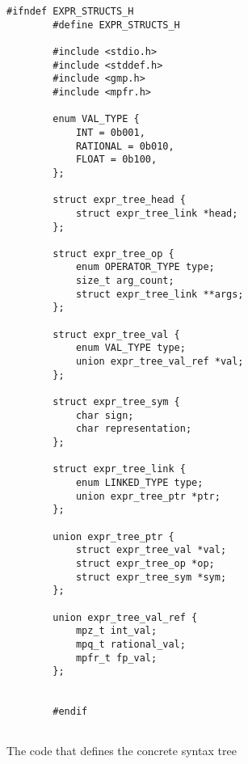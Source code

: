 \begin{figure}
	\centering
	\begin{lstlisting}[style=CStyle]
		#ifndef EXPR_STRUCTS_H
		#define EXPR_STRUCTS_H
		
		#include <stdio.h>
		#include <stddef.h>
		#include <gmp.h>
		#include <mpfr.h>
		
		enum VAL_TYPE {
			INT = 0b001,
			RATIONAL = 0b010,
			FLOAT = 0b100,
		};
		
		struct expr_tree_head {
			struct expr_tree_link *head;
		};
		
		struct expr_tree_op {
			enum OPERATOR_TYPE type;
			size_t arg_count;
			struct expr_tree_link **args;
		};
		
		struct expr_tree_val {
			enum VAL_TYPE type;
			union expr_tree_val_ref *val;
		};
		
		struct expr_tree_sym {
			char sign;
			char representation;
		};
		
		struct expr_tree_link {
			enum LINKED_TYPE type;
			union expr_tree_ptr *ptr;
		};
		
		union expr_tree_ptr {
			struct expr_tree_val *val;
			struct expr_tree_op *op;
			struct expr_tree_sym *sym;
		};
		
		union expr_tree_val_ref {
			mpz_t int_val;
			mpq_t rational_val;
			mpfr_t fp_val;
		};
		
		
		#endif
		
	\end{lstlisting}
	\caption{The code that defines the concrete syntax tree} \label{code:expr_structs}
\end{figure}